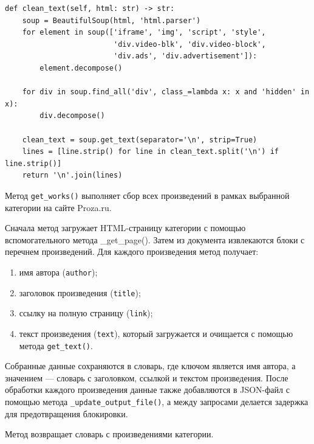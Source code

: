 \documentclass[coursework]{SCWorks}
\begin{document}
    \begin{verbatim}
def clean_text(self, html: str) -> str:
    soup = BeautifulSoup(html, 'html.parser')
    for element in soup(['iframe', 'img', 'script', 'style',
                         'div.video-blk', 'div.video-block',
                         'div.ads', 'div.advertisement']):
        element.decompose()

    for div in soup.find_all('div', class_=lambda x: x and 'hidden' in x):
        div.decompose()

    clean_text = soup.get_text(separator='\n', strip=True)
    lines = [line.strip() for line in clean_text.split('\n') if line.strip()]
    return '\n'.join(lines)
    \end{verbatim}

    Метод \texttt{get\_works()} выполняет сбор всех произведений в рамках выбранной категории на сайте Proza.ru.

    Сначала метод загружает HTML-страницу категории с помощью вспомогательного метода \_get\_page().
    Затем из документа извлекаются блоки с перечнем произведений.
    Для каждого произведения метод получает:
    \begin{enumerate}
        \item имя автора (\texttt{author});
        \item заголовок произведения (\texttt{title});
        \item ссылку на полную страницу (\texttt{link});
        \item текст произведения (\texttt{text}), который загружается и очищается с помощью метода \texttt{get\_text()}.
    \end{enumerate}

    Собранные данные сохраняются в словарь, где ключом является имя автора, а значением — словарь с заголовком, ссылкой и текстом произведения.
    После обработки каждого произведения данные также добавляются в JSON-файл с помощью метода \texttt{\_update\_output\_file()}, а между запросами делается задержка для предотвращения блокировки.

    Метод возвращает словарь с произведениями категории.
\end{document}
